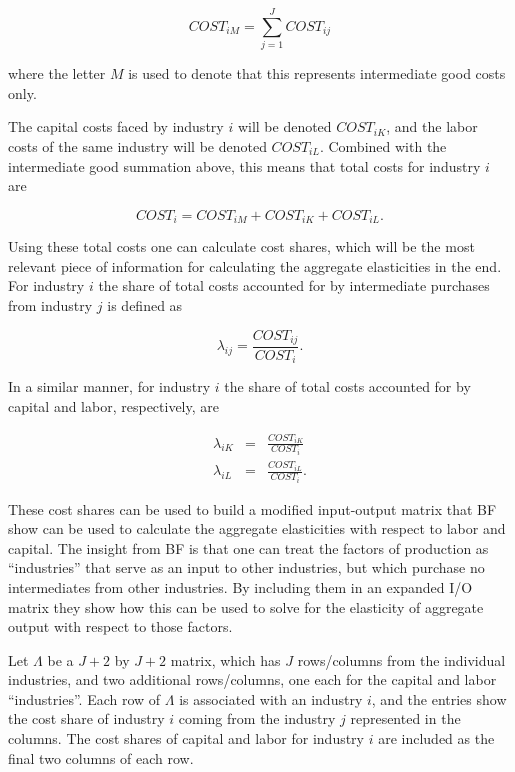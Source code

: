 \documentclass[11pt]{article}
\begin{document}
\begin{equation}
	COST_{iM} = \sum_{j=1}^{J} COST_{ij}
\end{equation}

where the letter $M$ is used to denote that this represents intermediate good costs only.

The capital costs faced by industry $i$ will be denoted $COST_{iK}$, and the labor costs of the same industry will be denoted $COST_{iL}$. Combined with the intermediate good summation above, this means that total costs for industry $i$ are

\begin{equation}
	COST_i = COST_{iM} + COST_{iK} + COST_{iL}. \label{EQ_costi}
\end{equation}

Using these total costs one can calculate cost shares, which will be the most relevant piece of information for calculating the aggregate elasticities in the end. For industry $i$ the share of total costs accounted for by intermediate purchases from industry $j$ is defined as

\begin{equation}
	\lambda_{ij} = \frac{COST_{ij}}{COST_i}. \label{EQ_lambdaij}
\end{equation}

In a similar manner, for industry $i$ the share of total costs accounted for by capital and labor, respectively, are

\begin{eqnarray}
	\lambda_{iK} &=& \frac{COST_{iK}}{COST_i} \\
	\lambda_{iL} &=& \frac{COST_{iL}}{COST_i}.
\end{eqnarray}

These cost shares can be used to build a modified input-output matrix that BF show can be used to calculate the aggregate elasticities with respect to labor and capital. The insight from BF is that one can treat the factors of production as ``industries'' that serve as an input to other industries, but which purchase no intermediates from other industries. By including them in an expanded I/O matrix they show how this can be used to solve for the elasticity of aggregate output with respect to those factors. 

Let $\Lambda$ be a $J+2$ by $J+2$ matrix, which has $J$ rows/columns from the individual industries, and two additional rows/columns, one each for the capital and labor ``industries''. Each row of $\Lambda$ is associated with an industry $i$, and the entries show the cost share of industry $i$ coming from the industry $j$ represented in the columns. The cost shares of capital and labor for industry $i$ are included as the final two columns of each row. 
\end{document}
